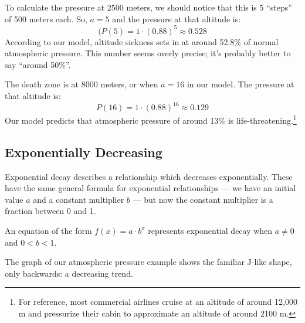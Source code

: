 To calculate the pressure at 2500 meters, we should notice that this is 5 ``steps'' of 500 meters each. So, $a=5$ and the pressure at that altitude is:
\[(P(5) = 1\cdot(0.88)^5 \approx 0.528\]
According to our model, altitude sickness sets in at around 52.8\% of normal atmospheric pressure. This number seems overly precise; it's probably better to say ``around 50\%''.

The death zone is at 8000 meters, or when $a=16$ in our model. The pressure at that altitude is:
\[P(16) = 1\cdot(0.88)^{16} \approx 0.129\]
Our model predicts that atmospheric pressure of around 13\% is life-threatening.\footnote{For reference, most commercial airlines cruise at an altitude of around 12,000 m and pressurize their cabin to approximate an altitude of around 2100 m.}

\subsection{Exponentially Decreasing}

Exponential decay describes a relationship which decreases exponentially. These have the same general formula for exponential relationships --- we have an initial value $a$ and a constant multiplier $b$ --- but now the constant multiplier is a fraction between 0 and 1.

\begin{boxeddef}
An equation of the form $f(x) = a \cdot b^x$ represents exponential decay when $a \neq 0$ and $0 < b < 1$.
\end{boxeddef}

The graph of our atmospheric pressure example shows the familiar J-like shape, only backwards: a decreasing trend.

\begin{center}
\end{center}


